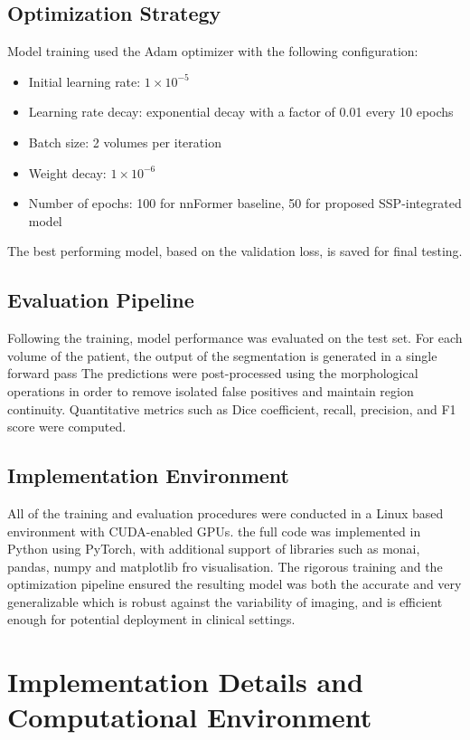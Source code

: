 \subsection{Optimization Strategy}
Model training used the Adam optimizer \cite{Kingma2015Adam} with the following configuration:

\begin{itemize} \item Initial learning rate: $1 \times 10^{-5}$ \item Learning rate decay: exponential decay with a factor of 0.01 every 10 epochs \item Batch size: 2 volumes per iteration \item Weight decay: $1 \times 10^{-6}$ \item Number of epochs: 100 for nnFormer baseline, 50 for proposed SSP-integrated model \end{itemize}

The best performing model, based on the validation loss, is saved for final testing.

\subsection{Evaluation Pipeline}
Following the training, model performance was evaluated on the test set. For each volume of the patient, the output of the segmentation is generated in a single forward pass The predictions were post-processed using the morphological operations in order to remove isolated false positives and maintain region continuity. Quantitative metrics such as Dice coefficient, recall, precision, and F1 score were computed.

\subsection{Implementation Environment}
All of the training and evaluation procedures were conducted in a Linux based environment with CUDA-enabled GPUs. the full code was implemented in Python using PyTorch, with additional support of libraries such as monai, pandas, numpy and matplotlib fro visualisation. The rigorous training and the optimization pipeline ensured the resulting model was both the accurate and very generalizable which is robust against the variability of imaging, and is efficient enough for potential deployment in clinical settings.

\section{Implementation Details and Computational Environment}

